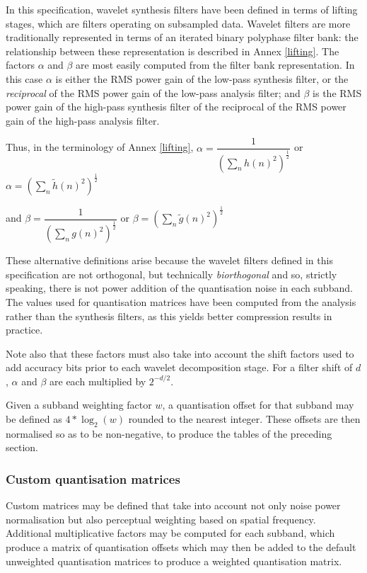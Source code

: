 \begin{informative*}

In this specification, wavelet synthesis filters have been defined in terms of lifting stages,
which are filters operating on subsampled data. Wavelet filters are more traditionally
represented in terms of an iterated binary polyphase filter bank: the relationship between
these representation is described in Annex \ref{lifting}. The factors $\alpha$ and $\beta$
are most easily computed from the filter bank representation. In this case $\alpha$ is either
the RMS power gain of the low-pass synthesis filter, or the {\em reciprocal} of the RMS power
gain of the low-pass analysis filter; and $\beta$ is the RMS power gain of the high-pass
synthesis filter of the reciprocal of the RMS power gain of the high-pass analysis filter. 

Thus, in the terminology of Annex \ref{lifting}, 
$\alpha=\dfrac{1}{(\sum_n h(n)^2)^{\frac{1}{2}}}$ or
$\alpha=(\sum_n \tilde{h}(n)^2)^{\frac{1}{2}}$

and
$\beta=\dfrac{1}{(\sum_n g(n)^2)^{\frac{1}{2}}}$ or
$\beta=(\sum_n \tilde{g}(n)^2)^{\frac{1}{2}}$

These alternative definitions arise because the wavelet filters defined in this specification
are not orthogonal, but technically {\em biorthogonal} and so, strictly speaking, there is
not power addition of the quantisation noise in each subband. The values used for quantisation
matrices have been computed from the analysis rather than the synthesis filters, as this yields
better compression results in practice.

Note also that these factors must also take into account the shift factors used to add accuracy 
bits prior to each wavelet decomposition stage. For a filter shift of $d$, $\alpha$ and 
$\beta$ are each multiplied by $2^{-d/2}$.

Given a subband weighting factor $w$, a quantisation offset for that subband may be defined 
as $4*\log_2(w)$ rounded to the nearest integer. These offsets are then normalised so as
to be non-negative, to produce the tables of the preceding section.

\subsubsection{Custom quantisation matrices}
\label{custommatrices}

Custom matrices may be defined that take into account not only noise power normalisation
but also perceptual weighting based on spatial frequency. Additional multiplicative factors
may be computed for each subband, which produce a matrix of quantisation offsets which may
then be added to the default unweighted quantisation matrices to produce a weighted quantisation
matrix.


\end{informative*}
